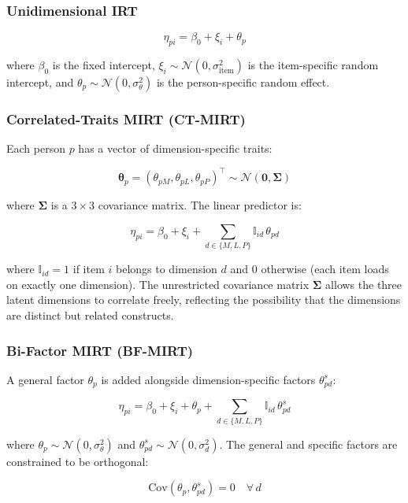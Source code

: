 \documentclass[
  man,
  floatsintext,
  longtable,
  nolmodern,
  notxfonts,
  notimes,
  colorlinks=true,linkcolor=blue,citecolor=blue,urlcolor=blue]{apa7}
\begin{document}
\subsubsection{Unidimensional IRT}\label{unidimensional-irt}

\[
\eta_{pi} = \beta_0 + \xi_i + \theta_p
\]

where \(\beta_0\) is the fixed intercept,
\(\xi_i \sim \mathcal{N}(0, \sigma^2_{\text{item}})\) is the
item-specific random intercept, and
\(\theta_p \sim \mathcal{N}(0, \sigma^2_{\theta})\) is the
person-specific random effect.

\subsubsection{Correlated-Traits MIRT
(CT-MIRT)}\label{correlated-traits-mirt-ct-mirt}

Each person \(p\) has a vector of dimension-specific traits:

\[
\boldsymbol{\theta}_p = (\theta_{pM}, \theta_{pL}, \theta_{pP})^\top \sim \mathcal{N}(\mathbf{0}, \boldsymbol{\Sigma})
\]

where \(\boldsymbol{\Sigma}\) is a \(3 \times 3\) covariance matrix. The
linear predictor is:

\[
\eta_{pi} = \beta_0 + \xi_i + \sum_{d \in \{M, L, P\}} \mathbb{I}_{id}\, \theta_{pd}
\]

where \(\mathbb{I}_{id} = 1\) if item \(i\) belongs to dimension \(d\)
and 0 otherwise (each item loads on exactly one dimension). The
unrestricted covariance matrix \(\boldsymbol{\Sigma}\) allows the three
latent dimensions to correlate freely, reflecting the possibility that
the dimensions are distinct but related constructs.

\subsubsection{Bi-Factor MIRT (BF-MIRT)}\label{bi-factor-mirt-bf-mirt}

A general factor \(\theta_p\) is added alongside dimension-specific
factors \(\theta_{pd}^{s}\):

\[
\eta_{pi} = \beta_0 + \xi_i + \theta_p + \sum_{d \in \{M, L, P\}} \mathbb{I}_{id}\, \theta_{pd}^{s}
\]

where \(\theta_p \sim \mathcal{N}(0, \sigma^2_{\theta})\) and
\(\theta_{pd}^{s} \sim \mathcal{N}(0, \sigma^2_{d})\). The general and
specific factors are constrained to be orthogonal:

\[
\text{Cov}(\theta_p, \theta_{pd}^{s}) = 0 \quad \forall\, d
\]
\end{document}
